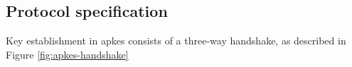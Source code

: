 



\subsection{Protocol specification}
\label{subsec:apkes-spec}

Key establishment in \gls{apkes} consists of a three-way handshake, as described in Figure \ref{fig:apkes-handshake}

